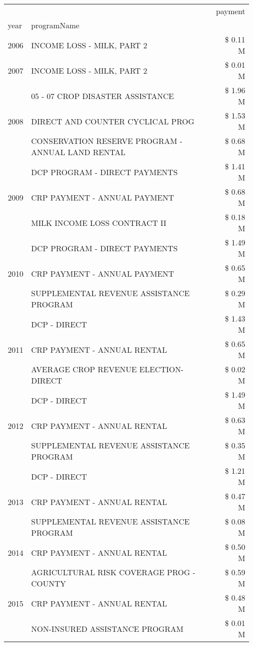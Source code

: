 \begin{tabular}{llr}
\toprule
 &  & payment \\
year & programName &  \\
\midrule
2006 & INCOME LOSS - MILK, PART 2 & \$ 0.11 M \\
\cline{1-3}
2007 & INCOME LOSS - MILK, PART 2 & \$ 0.01 M \\
\cline{1-3}
\multirow[t]{3}{*}{2008} & 05 - 07 CROP DISASTER ASSISTANCE & \$ 1.96 M \\
 & DIRECT AND COUNTER CYCLICAL PROG & \$ 1.53 M \\
 & CONSERVATION RESERVE PROGRAM - ANNUAL LAND RENTAL & \$ 0.68 M \\
\cline{1-3}
\multirow[t]{3}{*}{2009} & DCP PROGRAM - DIRECT PAYMENTS & \$ 1.41 M \\
 & CRP PAYMENT - ANNUAL PAYMENT & \$ 0.68 M \\
 & MILK INCOME LOSS CONTRACT II & \$ 0.18 M \\
\cline{1-3}
\multirow[t]{3}{*}{2010} & DCP PROGRAM - DIRECT PAYMENTS & \$ 1.49 M \\
 & CRP PAYMENT - ANNUAL PAYMENT & \$ 0.65 M \\
 & SUPPLEMENTAL REVENUE ASSISTANCE PROGRAM & \$ 0.29 M \\
\cline{1-3}
\multirow[t]{3}{*}{2011} & DCP - DIRECT & \$ 1.43 M \\
 & CRP PAYMENT - ANNUAL RENTAL & \$ 0.65 M \\
 & AVERAGE CROP REVENUE ELECTION-DIRECT & \$ 0.02 M \\
\cline{1-3}
\multirow[t]{3}{*}{2012} & DCP - DIRECT & \$ 1.49 M \\
 & CRP PAYMENT - ANNUAL RENTAL & \$ 0.63 M \\
 & SUPPLEMENTAL REVENUE ASSISTANCE PROGRAM & \$ 0.35 M \\
\cline{1-3}
\multirow[t]{3}{*}{2013} & DCP - DIRECT & \$ 1.21 M \\
 & CRP PAYMENT - ANNUAL RENTAL & \$ 0.47 M \\
 & SUPPLEMENTAL REVENUE ASSISTANCE PROGRAM & \$ 0.08 M \\
\cline{1-3}
2014 & CRP PAYMENT - ANNUAL RENTAL & \$ 0.50 M \\
\cline{1-3}
\multirow[t]{3}{*}{2015} & AGRICULTURAL RISK COVERAGE PROG - COUNTY & \$ 0.59 M \\
 & CRP PAYMENT - ANNUAL RENTAL & \$ 0.48 M \\
 & NON-INSURED ASSISTANCE PROGRAM & \$ 0.01 M \\

\end{tabular}
